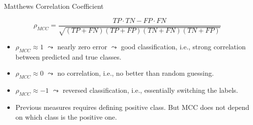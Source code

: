 \documentclass[11pt,compress,t,notes=noshow, xcolor=table]{beamer}
\begin{document}
\begin{vbframe}{Matthews Correlation Coefficient}
    \small{
        $$   \rho_{MCC} = \frac{TP\cdot TN - FP \cdot FN}{\sqrt{(TP+FN)(TP+FP)(TN+FN)(TN+FP)}}$$

        \begin{itemize}
            \item $\rho_{MCC} \approx 1$ $\leadsto$ nearly zero error $\leadsto$ good classification, i.e., strong correlation between predicted and true classes.
            \vspace{10pt}
    	
            \item $\rho_{MCC} \approx 0$ $\leadsto$ no correlation, i.e., no better than random guessing.
            \vspace{10pt}
    	
            \item $\rho_{MCC} \approx -1$ $\leadsto$ reversed classification, i.e., essentially switching the labels.
            \vspace{10pt}
    
            \item Previous measures requires defining positive class. But MCC does not depend on which class is the positive one.
            
        \end{itemize}
         
    }
    
\end{vbframe}
\end{document}
